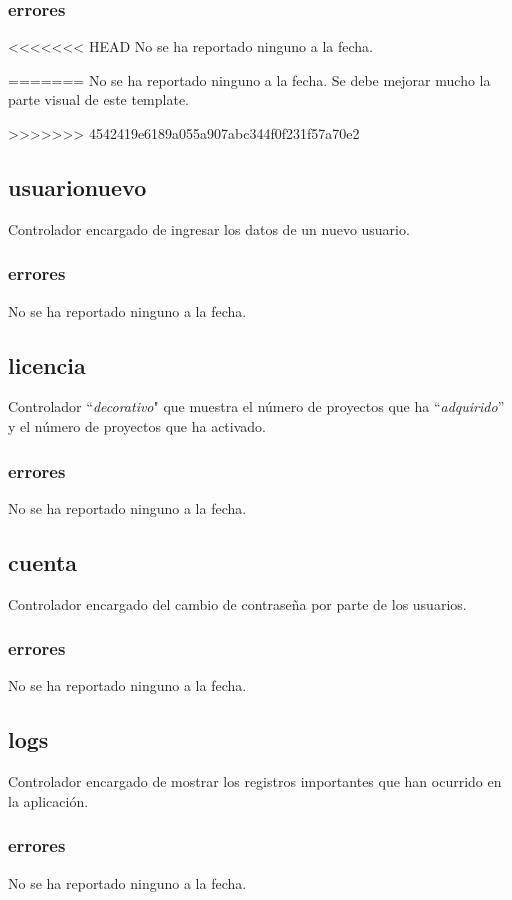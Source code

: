 \documentclass[10pt,a4paper]{book}
\begin{document}
	\subsubsection{errores}
<<<<<<< HEAD
	No se ha reportado ninguno a la fecha.

=======
	No se ha reportado ninguno a la fecha. Se debe mejorar mucho la parte visual de este template.
	
>>>>>>> 4542419e6189a055a907abc344f0f231f57a70e2
	\subsection{usuarionuevo}
	Controlador encargado de ingresar los datos de un nuevo usuario.
	\subsubsection{errores}
	No se ha reportado ninguno a la fecha.


	\subsection{licencia}
	Controlador ``\textit{decorativo}" que muestra el número de proyectos que ha ``\textit{adquirido}'' y el número de proyectos que ha activado.
	\subsubsection{errores}
	No se ha reportado ninguno a la fecha.

	\subsection{cuenta}
	Controlador encargado del cambio de contraseña por parte de los usuarios.
	\subsubsection{errores}
	No se ha reportado ninguno a la fecha.

	\subsection{logs}
	Controlador encargado de mostrar los registros importantes que han ocurrido en la aplicación.
	\subsubsection{errores}
	No se ha reportado ninguno a la fecha.
\end{document}

